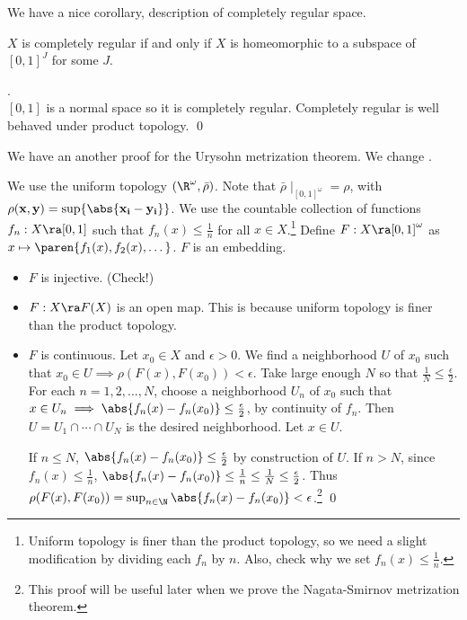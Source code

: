 We have a nice corollary, description of completely regular space.

 \(X\) is completely regular if and only if \(X\) is homeomorphic to a subspace of \([0, 1]^J\) for some \(J\).

\pf \note{\mimp} . \\
\note{\mimpd} \([0, 1]\) is a normal space so it is completely regular. Completely regular is well behaved under product topology. \qed

We have an another proof for the Urysohn metrization theorem. We change .

\pf We use the uniform topology \((\R^\omega, \bar{\rho})\). Note that \(\bar{\rho} \mid_{[0, 1]^\omega} = \rho\), with \(\rho(\bf{x}, \bf{y}) = \sup\{\abs{x_i - y_i}\}\). We use the countable collection of functions \(f_n : X \ra [0, 1]\) such that \(f_n(x) \leq \frac{1}{n}\) for all \(x \in X\).\footnote{Uniform topology is finer than the product topology, so we need a slight modification by dividing each \(f_n\) by \(n\). Also, check why we set \(f_n(x) \leq \frac{1}{n}\).} Define \(F: X \ra [0, 1]^\omega\) as \(x \mapsto \paren{f_1(x), f_2(x), \dots}\). \(F\) is an embedding.
\begin{itemize}
    \item \(F\) is injective. (Check!)
    \item \(F: X \ra F(X)\) is an open map. This is because uniform topology is finer than the product topology.
    \item \(F\) is continuous. Let \(x_0 \in X\) and \(\epsilon > 0\). We find a neighborhood \(U\) of \(x_0\) such that \(x_0 \in U \implies \rho(F(x), F(x_0)) < \epsilon\). Take large enough \(N\) so that \(\frac{1}{N} \leq \frac{\epsilon}{2}\). For each \(n = 1, 2, \dots, N\), choose a neighborhood \(U_n\) of \(x_0\) such that \(x \in U_n \implies \abs{f_n(x) - f_n(x_0)} \leq \frac{\epsilon}{2}\), by continuity of \(f_n\). Then \(U = U_1 \cap \cdots \cap U_N\) is the desired neighborhood. Let \(x \in U\).

    If \(n \leq N\), \(\abs{f_n(x) - f_n(x_0)} \leq \frac{\epsilon}{2}\) by construction of \(U\). If \(n > N\), since \(f_n(x) \leq \frac{1}{n}\), \(\abs{f_n(x) - f_n(x_0)} \leq \frac{1}{n} \leq \frac{1}{N} \leq \frac{\epsilon}{2}\). Thus \(\rho(F(x), F(x_0)) = \sup_{n \in \N} \abs{f_n(x) - f_n(x_0)} < \epsilon\).\footnote{This proof will be useful later when we prove the Nagata-Smirnov metrization theorem.} \qed
\end{itemize}

